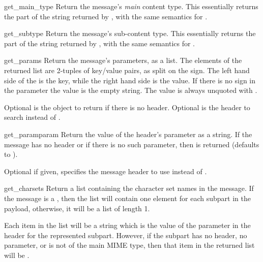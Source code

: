 \begin{methoddesc}[Message]{get_main_type}{}
Return the message's \emph{main} content type.  This essentially returns the
 part of the string returned by , with the
same semantics for .
\end{methoddesc}

\begin{methoddesc}[Message]{get_subtype}{}
Return the message's sub-content type.  This essentially returns the
 part of the string returned by , with the
same semantics for .
\end{methoddesc}

\begin{methoddesc}[Message]{get_params}{}
Return the message's  parameters, as a list.  The
elements of the returned list are 2-tuples of key/value pairs, as
split on the \samp{=} sign.  The left hand side of the \samp{=} is the
key, while the right hand side is the value.  If there is no \samp{=}
sign in the parameter the value is the empty string.  The value is
always unquoted with .

Optional  is the object to return if there is no
 header.  Optional  is the header to
search instead of .
\end{methoddesc}

\begin{methoddesc}[Message]{get_param}{param}
Return the value of the  header's parameter
 as a string.  If the message has no 
header or if there is no such parameter, then  is
returned (defaults to ).

Optional  if given, specifies the message header to use
instead of .
\end{methoddesc}

\begin{methoddesc}[Message]{get_charsets}{}
Return a list containing the character set names in the message.  If
the message is a , then the list will contain one
element for each subpart in the payload, otherwise, it will be a list
of length 1.

Each item in the list will be a string which is the value of the
 parameter in the  header for the
represented subpart.  However, if the subpart has no
 header, no  parameter, or is not of
the  main MIME type, then that item in the returned list
will be .
\end{methoddesc}

